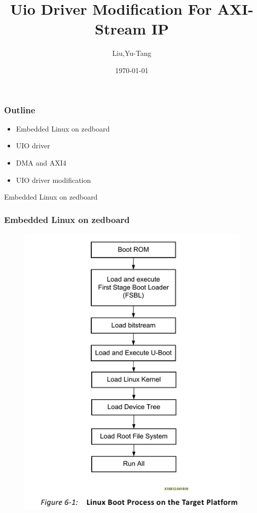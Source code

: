 \documentclass{beamer}
\title{Uio Driver Modification For AXI-Stream IP}
\author{Liu,Yu-Tang}
\date{\today}
\begin{document}
 

\maketitle  %

\begin{frame}
\frametitle{Outline}
\begin{itemize}
\item Embedded Linux on zedboard
\item UIO driver
\item DMA and AXI4
\item UIO driver modification
\end{itemize}
\end{frame}

\begin{frame}
\centering Embedded Linux on zedboard
\end{frame}






\begin{frame}
\frametitle{Embedded Linux on zedboard}
\begin{figure}
\centering\includegraphics[scale=0.35]{boot.png}

\end{figure}
\end{frame}
\end{document}
